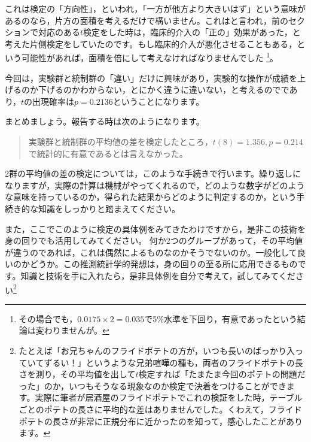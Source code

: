 \documentclass{ltjsarticle}
\begin{document}
{これは検定の「方向性」，といわれ，「一方が他方より大きいはず」という意味があるのなら，片方の面積を考えるだけで構いません。これはと言われ，前のセクションで対応のある$t$検定をした時は，臨床的介入の「正の」効果があった，と考えた片側検定をしていたのです。もし臨床的介入が悪化させることもある，という可能性があれば，面積を倍にして考えなければなりませんでした
\footnote{その場合でも，$0.0175\times2=0.035$で5\%水準を下回り，有意であったという結論は変わりませんが。}。

今回は，実験群と統制群の「違い」だけに興味があり，実験的な操作が成績を上げるのか下げるのかわからない，とにかく違うに違いない，と考えるのでであり，$t$の出現確率は$p=0.2136$ということになります。


まとめましょう。報告する時は次のようになります。
\begin{quote}
	実験群と統制群の平均値の差を検定したところ，$t(8)=1.356,p=0.214$で統計的に有意であるとは言えなかった。
\end{quote}

2群の平均値の差の検定については，このような手続きで行います。繰り返しになりますが，実際の計算は機械がやってくれるので，どのような数字がどのような意味を持っているのか，得られた結果からどのように判定するのか，という手続き的な知識をしっかりと踏まえてください。

また，ここでこのように検定の具体例をみてきたわけですから，是非この技術を身の回りでも活用してみてください。
何か2つのグループがあって，その平均値が違うのであれば，これは偶然によるものなのかそうでないのか。一般化して良いのかどうか。この推測統計学的発想は，身の回りの至る所に応用できるものです。知識と技術を手に入れたら，是非具体例を自分で考えて，試してみてください\footnote{たとえば「お兄ちゃんのフライドポテトの方が，いつも長いのばっかり入っていてずるい！」というような兄弟喧嘩の種も，両者のフライドポテトの長さを測り，その平均値を出して$t$検定すれば「たまたま今回のポテトの問題だった」のか，いつもそうなる現象なのか検定で決着をつけることができます。実際に筆者が居酒屋のフライドポテトでこれの検証をした時，テーブルごとのポテトの長さに平均的な差はありませんでした。くわえて，フライドポテトの長さが非常に正規分布に近かったのを知って，感心したことがあります。}

}
\end{document}
